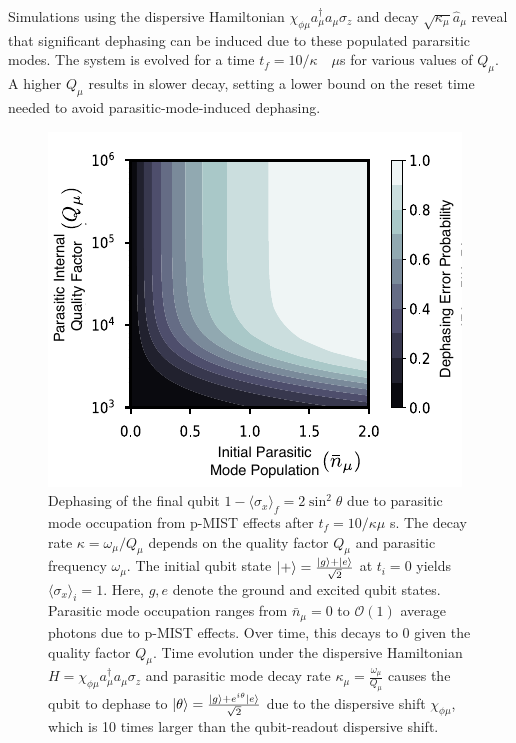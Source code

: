 \documentclass[prx,showpacs,notitlepage,twocolumn,superscriptaddress,nofootinbib,preprintnumbers,floatfix]{revtex4-2}
\begin{document}
Simulations using the dispersive Hamiltonian $\chi_{\phi\mu}a_\mu^\dagger a_\mu \sigma_z$ and decay $\sqrt{\kappa_\mu}\hat a_\mu$ reveal that significant dephasing can be induced due to these populated pararsitic modes. The system is evolved for a time $t_f=10/\kappa\quad \mu$s for various values of $Q_\mu$. A higher $Q_\mu$ results in slower decay, setting a lower bound on the reset time needed to avoid parasitic-mode-induced dephasing.
\begin{figure}
    \centering
    \includegraphics[width=\linewidth]{Figures/dephasing.pdf}
    \caption{Dephasing of the final qubit $1-\langle \sigma_x \rangle_f = 2\sin^2 \theta$ due to parasitic mode occupation from p-MIST effects after $t_f = 10/\kappa \mu$ s. The decay rate $\kappa=\omega_\mu/Q_\mu$ depends on the quality factor $Q_\mu$ and parasitic frequency $\omega_\mu$. The initial qubit state $\ket{+} = \frac{\ket{g} + \ket{e}}{\sqrt{2}}$ at $t_i = 0$ yields $\langle \sigma_x \rangle_i = 1$. Here, $g, e$ denote the ground and excited qubit states. Parasitic mode occupation ranges from $ \bar{n}_\mu = 0$ to $\mathcal{O}(1)$ average photons due to p-MIST effects. Over time, this decays to 0 given the quality factor $Q_\mu$. Time evolution under the dispersive Hamiltonian $H = \chi_{\phi\mu}a_\mu^\dagger a_\mu\sigma_z$ and parasitic mode decay rate $\kappa_\mu = \frac{\omega_\mu}{Q_\mu}$ causes the qubit to dephase to $\ket{\theta}=\frac{\ket{g} + e^{i\theta}\ket{e}}{\sqrt{2}}$ due to the dispersive shift $\chi_{\phi\mu}$, which is 10 times larger than the qubit-readout dispersive shift. }
    \label{fig:dephasing}
\end{figure}
\end{document}

